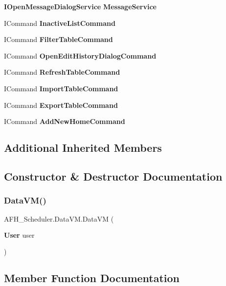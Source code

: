 \begin{DoxyCompactItemize}
\textbf{ I\+Open\+Message\+Dialog\+Service} \textbf{ Message\+Service}\hspace{0.3cm}{\ttfamily  [get]}
\item 
I\+Command \textbf{ Inactive\+List\+Command}\hspace{0.3cm}{\ttfamily  [get]}
\item 
I\+Command \textbf{ Filter\+Table\+Command}\hspace{0.3cm}{\ttfamily  [get]}
\item 
I\+Command \textbf{ Open\+Edit\+History\+Dialog\+Command}\hspace{0.3cm}{\ttfamily  [get]}
\item 
I\+Command \textbf{ Refresh\+Table\+Command}\hspace{0.3cm}{\ttfamily  [get]}
\item 
I\+Command \textbf{ Import\+Table\+Command}\hspace{0.3cm}{\ttfamily  [get]}
\item 
I\+Command \textbf{ Export\+Table\+Command}\hspace{0.3cm}{\ttfamily  [get]}
\item 
I\+Command \textbf{ Add\+New\+Home\+Command}\hspace{0.3cm}{\ttfamily  [get]}
\end{DoxyCompactItemize}
\subsection*{Additional Inherited Members}


\subsection{Constructor \& Destructor Documentation}
\mbox{\label{class_a_f_h___scheduler_1_1_data_v_m_a113dee7503616a265d1cc353dd8a988f}} 
\subsubsection{DataVM()}
{\footnotesize\ttfamily A\+F\+H\+\_\+\+Scheduler.\+Data\+V\+M.\+Data\+VM (\begin{DoxyParamCaption}\item[{\textbf{ User}}]{user }\end{DoxyParamCaption})}



\subsection{Member Function Documentation}
\mbox{\label{class_a_f_h___scheduler_1_1_data_v_m_a9fb35689c7af2094dbce93b14a98c9a1}} 
